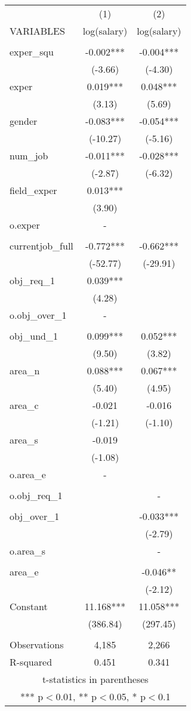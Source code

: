 \documentclass[]{article}
\begin{document}
\begin{tabular}{lcc} \hline
 & (1) & (2) \\
VARIABLES & log(salary) & log(salary) \\ \hline
 &  &  \\
exper\_squ & -0.002*** & -0.004*** \\
 & (-3.66) & (-4.30) \\
exper & 0.019*** & 0.048*** \\
 & (3.13) & (5.69) \\
gender & -0.083*** & -0.054*** \\
 & (-10.27) & (-5.16) \\
num\_job & -0.011*** & -0.028*** \\
 & (-2.87) & (-6.32) \\
field\_exper & 0.013*** &  \\
 & (3.90) &  \\
o.exper & - &  \\
 &  &  \\
currentjob\_full & -0.772*** & -0.662*** \\
 & (-52.77) & (-29.91) \\
obj\_req\_1 & 0.039*** &  \\
 & (4.28) &  \\
o.obj\_over\_1 & - &  \\
 &  &  \\
obj\_und\_1 & 0.099*** & 0.052*** \\
 & (9.50) & (3.82) \\
area\_n & 0.088*** & 0.067*** \\
 & (5.40) & (4.95) \\
area\_c & -0.021 & -0.016 \\
 & (-1.21) & (-1.10) \\
area\_s & -0.019 &  \\
 & (-1.08) &  \\
o.area\_e & - &  \\
 &  &  \\
o.obj\_req\_1 &  & - \\
 &  &  \\
obj\_over\_1 &  & -0.033*** \\
 &  & (-2.79) \\
o.area\_s &  & - \\
 &  &  \\
area\_e &  & -0.046** \\
 &  & (-2.12) \\
Constant & 11.168*** & 11.058*** \\
 & (386.84) & (297.45) \\
 &  &  \\
Observations & 4,185 & 2,266 \\
 R-squared & 0.451 & 0.341 \\ \hline
\multicolumn{3}{c}{ t-statistics in parentheses} \\
\multicolumn{3}{c}{ *** p$<$0.01, ** p$<$0.05, * p$<$0.1} \\
\end{tabular}
\end{document}
